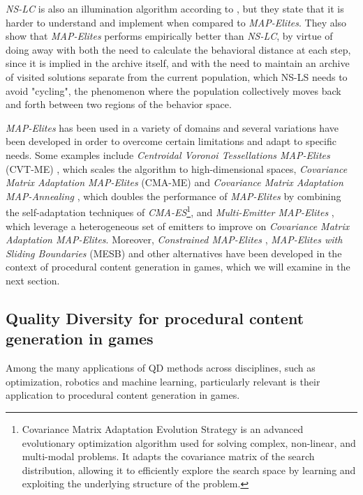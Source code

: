 \textit{NS-LC} is also an illumination algorithm according to \citeauthor{mouret_illuminating_2015}, but they state that it is harder to understand and implement when compared to \textit{MAP-Elites}. They also show that \textit{MAP-Elites} performs empirically better than \textit{NS-LC}, by virtue of doing away with both the need to calculate the behavioral distance at each step, since it is implied in the archive itself, and with the need to maintain an archive of visited solutions separate from the current population, which NS-LS needs to avoid "cycling", the phenomenon where the population collectively moves back and forth between two regions of the behavior space. \cite{mouret_illuminating_2015}

\textit{MAP-Elites} has been used in a variety of domains and several variations have been developed in order to overcome certain limitations and adapt to specific needs. Some examples include \textit{Centroidal Voronoi Tessellations MAP-Elites} (CVT-ME) \cite{vassiliades_using_2017}, which scales the algorithm to high-dimensional spaces, \textit{Covariance Matrix Adaptation MAP-Elites} (CMA-ME) \cite{fontaine_covariance_2020} and \textit{Covariance Matrix Adaptation MAP-Annealing} \cite{fontaine_covariance_2022}, which doubles the performance of \textit{MAP-Elites} by combining the self-adaptation techniques of \textit{CMA-ES}\footnote{Covariance Matrix Adaptation Evolution Strategy is an advanced evolutionary optimization algorithm used for solving complex, non-linear, and multi-modal problems. It adapts the covariance matrix of the search distribution, allowing it to efficiently explore the search space by learning and exploiting the underlying structure of the problem.}, and \textit{Multi-Emitter MAP-Elites} \cite{cully_multi-emitter_2021}, which leverage a heterogeneous set of emitters to improve on \textit{Covariance Matrix Adaptation MAP-Elites}. Moreover, \textit{Constrained MAP-Elites} \cite{khalifa_talakat_2018}, \textit{MAP-Elites with Sliding Boundaries} (MESB) \cite{fontaine_mapping_2019} and other alternatives have been developed in the context of procedural content generation in games, which we will examine in the next section.

\subsection{Quality Diversity for procedural content generation in games}
\label{subsec:qd_pcg}
Among the many applications of QD methods across disciplines, such as optimization, robotics and machine learning, particularly relevant is their application to procedural content generation in games.

